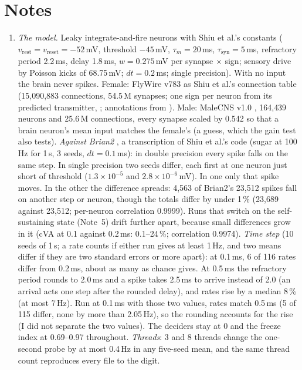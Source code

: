 \clearpage
\section*{Notes}
\small

\begin{enumerate}[leftmargin=*, label=\arabic*., itemsep=4pt]

\item \emph{The model.} Leaky integrate-and-fire neurons with Shiu et al.'s constants ($v_\text{rest}=v_\text{reset}=-52$\,mV, threshold $-45$\,mV, $\tau_m=20$\,ms, $\tau_\text{syn}=5$\,ms, refractory period 2.2\,ms, delay 1.8\,ms, $w=0.275$\,mV per synapse $\times$ sign; sensory drive by Poisson kicks of 68.75\,mV; $dt=0.2$\,ms; single precision). With no input the brain never spikes. Female: FlyWire v783 as Shiu et al.'s connection table (15{,}090{,}883 connections, 54.5\,M synapses; one sign per neuron from its predicted transmitter, \citealt{eckstein2024neurotransmitter}; annotations from \citealt{schlegel2024whole}). Male: MaleCNS v1.0 \citep{berg2026sexual}, 164{,}439 neurons and 25.6\,M connections, every synapse scaled by 0.542 so that a brain neuron's mean input matches the female's (a guess, which the gain test also tests). \emph{Against Brian2} \citep{stimberg2019brian}, a transcription of Shiu et al.'s code (sugar at 100\,Hz for 1\,s, 3 seeds, $dt=0.1$\,ms): in double precision every spike falls on the same step. In single precision two seeds differ, each first at one neuron just short of threshold ($1.3\times10^{-5}$ and $2.8\times10^{-6}$\,mV). In one only that spike moves. In the other the difference spreads: 4{,}563 of Brian2's 23{,}512 spikes fall on another step or neuron, though the totals differ by under 1\,\% (23{,}689 against 23{,}512; per-neuron correlation 0.9999). Runs that switch on the self-sustaining state (Note~5) drift further apart, because small differences grow in it (cVA at 0.1 against 0.2\,ms: 0.1--24\,\%; correlation 0.9974). \emph{Time step} (10 seeds of 1\,s; a rate counts if either run gives at least 1\,Hz, and two means differ if they are two standard errors or more apart): at 0.1\,ms, 6 of 116 rates differ from 0.2\,ms, about as many as chance gives. At 0.5\,ms the refractory period rounds to 2.0\,ms and a spike takes 2.5\,ms to arrive instead of 2.0 (an arrival acts one step after the rounded delay), and rates rise by a median 8\,\% (at most 7\,Hz). Run at 0.1\,ms with those two values, rates match 0.5\,ms (5 of 115 differ, none by more than 2.05\,Hz), so the rounding accounts for the rise (I did not separate the two values). The deciders stay at 0 and the freeze index at 0.69--0.97 throughout. \emph{Threads}: 3 and 8 threads change the one-second probe by at most 0.4\,Hz in any five-seed mean, and the same thread count reproduces every file to the digit.


\end{enumerate}
